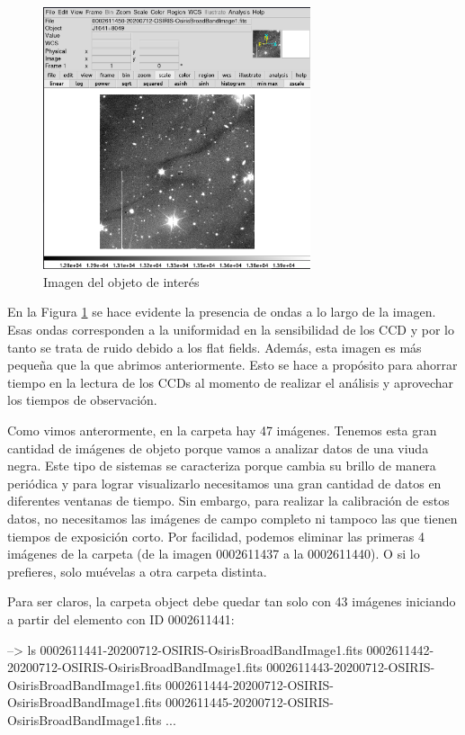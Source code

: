 \begin{figure}[htb]
  \centering
	\includegraphics[width=0.7\textwidth]{figures/ds9-noisses.png}
	\caption{Imagen del objeto de interés}
	\label{fig:ds9-noisses} 
\end{figure}

En la Figura \ref{fig:ds9-noisses} se hace evidente la presencia de ondas a lo largo de la imagen. Esas ondas corresponden a la uniformidad en la sensibilidad de los CCD y por lo tanto se trata de ruido debido a los flat fields. Además, esta imagen es más pequeña que la que abrimos anteriormente. Esto se hace a propósito para ahorrar tiempo en la lectura de los CCDs al momento de realizar el análisis y aprovechar los tiempos de observación. 

Como vimos anterormente, en la carpeta  hay 47 imágenes. Tenemos esta gran cantidad de imágenes de objeto porque vamos a analizar datos de una viuda negra. Este tipo de sistemas se caracteriza porque cambia su brillo de manera periódica y para lograr visualizarlo necesitamos una gran cantidad de datos en diferentes ventanas de tiempo. Sin embargo, para realizar la calibración de estos datos, no necesitamos las imágenes de campo completo ni tampoco las que tienen tiempos de exposición corto. Por facilidad, podemos eliminar las primeras 4 imágenes de la carpeta (de la imagen 0002611437 a la 0002611440). O si lo prefieres, solo muévelas a otra carpeta distinta. 

Para ser claros, la carpeta object debe quedar tan solo con 43 imágenes iniciando a partir del elemento con ID 0002611441:
\begin{shell}
--> ls
0002611441-20200712-OSIRIS-OsirisBroadBandImage1.fits
0002611442-20200712-OSIRIS-OsirisBroadBandImage1.fits
0002611443-20200712-OSIRIS-OsirisBroadBandImage1.fits
0002611444-20200712-OSIRIS-OsirisBroadBandImage1.fits
0002611445-20200712-OSIRIS-OsirisBroadBandImage1.fits
...

\end{shell}

